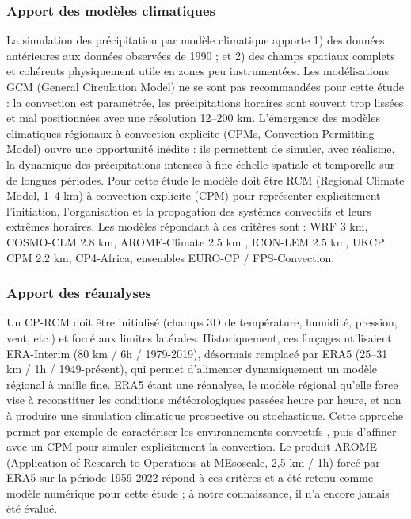\documentclass[
  article,
  nofooter,
  noheadings]{jss}
\begin{document}
\subsubsection{Apport des modèles
climatiques}\label{apport-des-moduxe8les-climatiques}

La simulation des précipitation par modèle climatique apporte 1) des
données antérieures aux données observées de 1990 ; et 2) des champs
spatiaux complets et cohérents physiquement utile en zones peu
instrumentées. Les modélisations GCM (General Circulation Model) ne se
sont pas recommandées pour cette étude : la convection est paramétrée,
les précipitations horaires sont souvent trop lissées et mal
positionnées avec une résolution 12--200 km. L'émergence des modèles
climatiques régionaux à convection explicite (CPMs,
Convection-Permitting Model) ouvre une opportunité inédite : ils
permettent de simuler, avec réalisme, la dynamique des précipitations
intenses à fine échelle spatiale et temporelle sur de longues périodes.
Pour cette étude le modèle doit être RCM (Regional Climate Model, 1--4
km) à convection explicite (CPM) pour représenter explicitement
l'initiation, l'organisation et la propagation des systèmes convectifs
et leurs extrêmes horaires. Les modèles répondant à ces critères sont :
WRF 3 km, COSMO‑CLM 2.8 km, AROME‑Climate 2.5 km \citep{cnrm_arome2007},
ICON-LEM 2.5 km, UKCP CPM 2.2 km, CP4‑Africa, ensembles EURO-CP /
FPS‑Convection.

\subsubsection{Apport des réanalyses}\label{apport-des-ruxe9analyses}

Un CP-RCM doit être initialisé (champs 3D de température, humidité,
pression, vent, etc.) et forcé aux limites latérales. Historiquement,
ces forçages utilisaient ERA-Interim (80 km / 6h / 1979-2019), désormais
remplacé par ERA5 (25--31 km / 1h / 1949-présent), qui permet
d'alimenter dynamiquement un modèle régional à maille fine. ERA5 étant
une réanalyse, le modèle régional qu'elle force vise à reconstituer les
conditions météorologiques passées heure par heure, et non à produire
une simulation climatique prospective ou stochastique. Cette approche
permet par exemple de caractériser les environnements convectifs
\citep{ecmwf_era5_data_documentation}, puis d'affiner avec un CPM pour
simuler explicitement la convection. Le produit AROME (Application of
Research to Operations at MEsoscale, 2,5 km / 1h) forcé par ERA5 sur la
période 1959-2022 répond à ces critères et a été retenu comme modèle
numérique pour cette étude ; à notre connaissance, il n'a encore jamais
été évalué.
\end{document}
